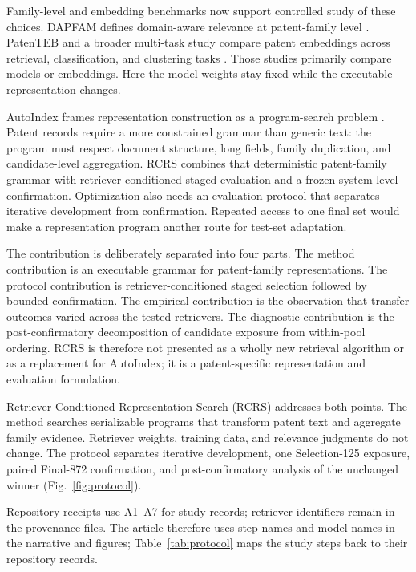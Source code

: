 \documentclass[final,5p,times,twocolumn]{elsarticle}
\newcommand{\RCRS}{RCRS}
\begin{document}
Family-level and embedding benchmarks now support controlled study of these
choices. DAPFAM defines domain-aware relevance at patent-family level
\cite{dapfam2026}. PatenTEB and a broader multi-task study compare patent
embeddings across retrieval, classification, and clustering tasks
\cite{patenteb2025,patentembeddings2026}. Those studies primarily compare
models or embeddings. Here the model weights stay fixed while the executable
representation changes.

AutoIndex frames representation construction as a program-search problem
\cite{autoindex2026}. Patent records require a more constrained grammar than
generic text: the program must respect document structure, long fields,
family duplication, and candidate-level aggregation. RCRS combines that
deterministic patent-family grammar with retriever-conditioned staged
evaluation and a frozen system-level confirmation. Optimization also
needs an evaluation protocol that separates iterative development from
confirmation.
Repeated access to one final set would make a representation program another
route for test-set adaptation.

The contribution is deliberately separated into four parts. The method
contribution is an executable grammar for patent-family representations. The
protocol contribution is retriever-conditioned staged selection followed by
bounded confirmation. The empirical contribution is the observation that
transfer outcomes varied across the tested retrievers. The diagnostic contribution is
the post-confirmatory decomposition of candidate exposure from within-pool
ordering. RCRS is therefore not presented as a wholly new retrieval algorithm
or as a replacement for AutoIndex; it is a patent-specific representation and
evaluation formulation.

Retriever-Conditioned Representation Search (\RCRS{}) addresses both points.
The method searches serializable
programs that transform patent text and aggregate family evidence. Retriever
weights, training data, and relevance judgments do not change. The protocol
separates iterative development, one Selection-125 exposure, paired Final-872
confirmation, and post-confirmatory analysis of the unchanged winner
(Fig.~\ref{fig:protocol}).

Repository receipts use A1--A7 for study records; retriever identifiers remain
in the provenance files. The article therefore uses step names and model names
in the narrative and figures; Table~\ref{tab:protocol} maps the study steps back
to their repository records.
\end{document}
